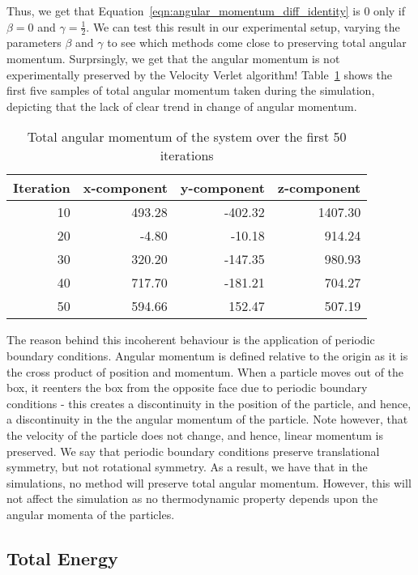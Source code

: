 \documentclass[../Main.tex]{subfiles}
\begin{document}
Thus, we get that Equation~\ref{eqn:angular_momentum_diff_identity} is 0 only if $\beta = 0$ and $\gamma = \frac{1}{2}$. 
We can test this result in our experimental setup, varying the parameters $\beta$ and $\gamma$ to see which methods come close to preserving total angular momentum. Surprsingly, we get that the angular momentum is not experimentally preserved by the Velocity Verlet algorithm! Table~\ref{tbl:total_angular_momentum_50_iterations} shows the first five samples of total angular momentum taken during the simulation, depicting that the lack of clear trend in change of angular momentum. 
\begin{table}[h]
	\centering
	\begin{tabular}{ |r|r|r|r| }
		\hline
		Iteration & x-component & y-component & z-component\\
		\hline
		10 & 493.28 & -402.32 & 1407.30 \\
		20 & -4.80 & -10.18 & 914.24 \\
		30 & 320.20 & -147.35 & 980.93 \\
		40 & 717.70 & -181.21 & 704.27 \\
		50 & 594.66 & 152.47 & 507.19 \\
		\hline
	\end{tabular}
	\caption{Total angular momentum of the system over the first 50 iterations}
	\label{tbl:total_angular_momentum_50_iterations}
\end{table}

The reason behind this incoherent behaviour is the application of periodic boundary conditions. Angular momentum is defined relative to the origin as it is the cross product of position and momentum. When a particle moves out of the box, it reenters the box from the opposite face due to periodic boundary conditions - this creates a discontinuity in the position of the particle, and hence, a discontinuity in the the angular momentum of the particle. Note however, that the velocity of the particle does not change, and hence, linear momentum is preserved. We say that periodic boundary conditions preserve translational symmetry, but not rotational symmetry.
As a result, we have that in the simulations, no method will preserve total angular momentum. However, this will not affect the simulation as no thermodynamic property depends upon the angular momenta of the particles.
 
\subsection{Total Energy}
\end{document}
